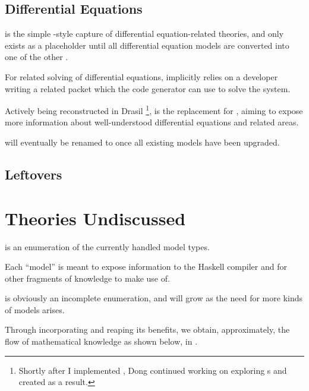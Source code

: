 
\subsection{Differential Equations}

\DEModel{} is the simple \RelationConcept{}-style capture of differential
equation-related theories, and only exists as a placeholder until all
differential equation models are converted into one of the other \ModelKinds{}.

For related solving of differential equations, \DEModel{} implicitly relies on a
developer writing a related \ODEInfo{} packet which
the code generator can use to solve the system.

Actively being reconstructed in Drasil \cite{Chen2022MEng} \footnote{Shortly
after I implemented \ModelKind{}, Dong continued working on exploring
\DEModel{}s and created \NewDEModel{} as a result.}, \NewDEModel{} is the
replacement for \DEModel{}, aiming to expose more information about
well-understood differential equations and related areas.

\NewDEModel{} will eventually be renamed to \DEModel{} once all existing
\DEModel{} models have been upgraded.


\subsection{Leftovers}


\section{Theories Undiscussed}

\ModelKinds{} is an enumeration of the currently handled model types.

Each ``model'' is meant to expose information to the Haskell compiler and for
other fragments of knowledge to make use of.

\ModelKinds{} is obviously an incomplete enumeration, and will grow as the need
for more kinds of models arises.

Through incorporating \ModelKinds{} and reaping its benefits, we obtain,
approximately, the flow of mathematical knowledge as shown below, in
.

